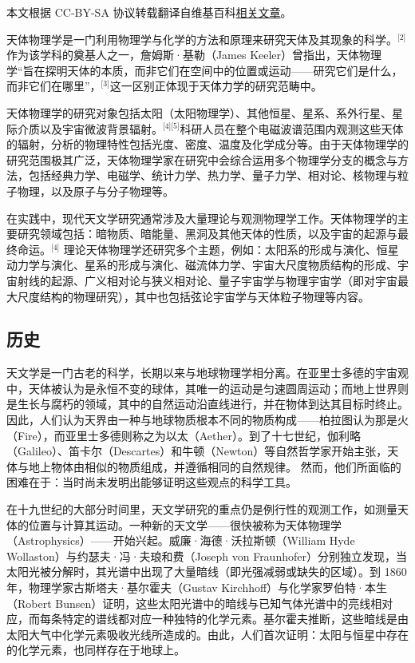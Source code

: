 
本文根据 CC-BY-SA 协议转载翻译自维基百科\href{https://en.wikipedia.org/wiki/Astrophysics?utm_source=chatgpt.com}{相关文章}。


天体物理学是一门利用物理学与化学的方法和原理来研究天体及其现象的科学。\(^\text{[2]}\)作为该学科的奠基人之一，詹姆斯·基勒（James Keeler）曾指出，天体物理学“旨在探明天体的本质，而非它们在空间中的位置或运动——研究它们是什么，而非它们在哪里”，\(^\text{[3]}\)这一区别正体现于天体力学的研究范畴中。

天体物理学的研究对象包括太阳（太阳物理学）、其他恒星、星系、系外行星、星际介质以及宇宙微波背景辐射。\(^\text{[4][5]}\)科研人员在整个电磁波谱范围内观测这些天体的辐射，分析的物理特性包括光度、密度、温度及化学成分等。由于天体物理学的研究范围极其广泛，天体物理学家在研究中会综合运用多个物理学分支的概念与方法，包括经典力学、电磁学、统计力学、热力学、量子力学、相对论、核物理与粒子物理，以及原子与分子物理等。

在实践中，现代天文学研究通常涉及大量理论与观测物理学工作。天体物理学的主要研究领域包括：暗物质、暗能量、黑洞及其他天体的性质，以及宇宙的起源与最终命运。\(^\text{[4]}\)
理论天体物理学还研究多个主题，例如：太阳系的形成与演化、恒星动力学与演化、星系的形成与演化、磁流体力学、宇宙大尺度物质结构的形成、宇宙射线的起源、广义相对论与狭义相对论、量子宇宙学与物理宇宙学（即对宇宙最大尺度结构的物理研究），其中也包括弦论宇宙学与天体粒子物理等内容。
\subsection{历史}
天文学是一门古老的科学，长期以来与地球物理学相分离。在亚里士多德的宇宙观中，天体被认为是永恒不变的球体，其唯一的运动是匀速圆周运动；而地上世界则是生长与腐朽的领域，其中的自然运动沿直线进行，并在物体到达其目标时终止。因此，人们认为天界由一种与地球物质根本不同的物质构成——柏拉图认为那是火（Fire），而亚里士多德则称之为以太（Aether）。\cite{ref6,ref7}到了十七世纪，伽利略（Galileo）、笛卡尔（Descartes）和牛顿（Newton）等自然哲学家开始主张，天体与地上物体由相似的物质组成，并遵循相同的自然规律。\cite{ref8,ref9,ref10,ref11} 然而，他们所面临的困难在于：当时尚未发明出能够证明这些观点的科学工具。\cite{ref12}


在十九世纪的大部分时间里，天文学研究的重点仍是例行性的观测工作，如测量天体的位置与计算其运动。\cite{ref13,ref14}一种新的天文学——很快被称为天体物理学（Astrophysics）——开始兴起。威廉·海德·沃拉斯顿（William Hyde Wollaston）与约瑟夫·冯·夫琅和费（Joseph von Fraunhofer）分别独立发现，当太阳光被分解时，其光谱中出现了大量暗线（即光强减弱或缺失的区域）。\cite{ref15}到 1860 年，物理学家古斯塔夫·基尔霍夫（Gustav Kirchhoff）与化学家罗伯特·本生（Robert Bunsen）证明，这些太阳光谱中的暗线与已知气体光谱中的亮线相对应，而每条特定的谱线都对应一种独特的化学元素。\cite{ref16}基尔霍夫推断，这些暗线是由太阳大气中化学元素吸收光线所造成的。\cite{ref17}由此，人们首次证明：太阳与恒星中存在的化学元素，也同样存在于地球上。

